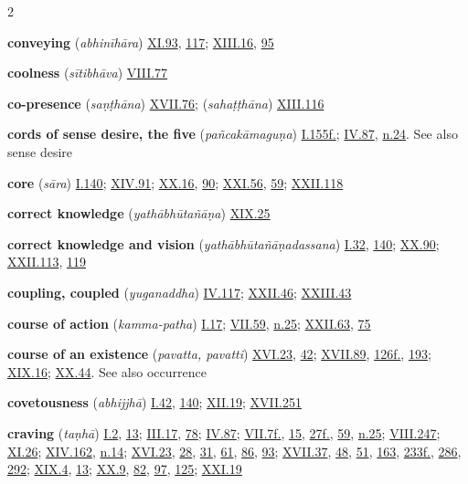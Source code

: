 \begin{multicols}{2}
\begin{vismHanging}
\par\textbf{conveying} (\emph{abhinīhāra}) \hyperlink{XI.93}{XI.93}{}, \hyperlink{XI.117}{117}{}; \hyperlink{XIII.16}{XIII.16}{}, \hyperlink{XIII.95}{95}{}
\par\textbf{coolness} (\emph{sītibhāva}) \hyperlink{VIII.77}{VIII.77}{}
\par\textbf{co-presence} (\emph{saṇṭhāna}) \hyperlink{XVII.76}{XVII.76}{}; (\emph{sahaṭṭhāna}) \hyperlink{XIII.116}{XIII.116}{}
\par\textbf{cords of sense desire, the five} (\emph{pañcakāmaguṇa}) \hyperlink{I.155}{I.155f.}{}; \hyperlink{IV.87}{IV.87}{}, \hyperlink{IV.n24}{n.24}{}. See also sense desire 
\par\textbf{core} (\emph{sāra}) \hyperlink{I.140}{I.140}{}; \hyperlink{XIV.91}{XIV.91}{}; \hyperlink{XX.16}{XX.16}{}, \hyperlink{XX.90}{90}{}; \hyperlink{XXI.56}{XXI.56}{}, \hyperlink{XXI.59}{59}{}; \hyperlink{XXII.118}{XXII.118}{}
\par\textbf{correct knowledge} (\emph{yathābhūtañāṇa}) \hyperlink{XIX.25}{XIX.25}{}
\par\textbf{correct knowledge and vision} (\emph{yathābhūtañāṇadassana}) \hyperlink{I.32}{I.32}{}, \hyperlink{I.140}{140}{}; \hyperlink{XX.90}{XX.90}{}; \hyperlink{XXII.113}{XXII.113}{}, \hyperlink{XXII.119}{119}{}
\par\textbf{coupling, coupled} (\emph{yuganaddha}) \hyperlink{IV.117}{IV.117}{}; \hyperlink{XXII.46}{XXII.46}{}; \hyperlink{XXIII.43}{XXIII.43}{}
\par\textbf{course of action} (\emph{kamma-patha}) \hyperlink{I.17}{I.17}{}; \hyperlink{VII.59}{VII.59}{}, \hyperlink{VII.n25}{n.25}{}; \hyperlink{XXII.63}{XXII.63}{}, \hyperlink{XXII.75}{75}{}
\par\textbf{course of an existence} (\emph{pavatta, pavatti}) \hyperlink{XVI.23}{XVI.23}{}, \hyperlink{XVI.42}{42}{}; \hyperlink{XVII.89}{XVII.89}{}, \hyperlink{XVII.126}{126f.}{}, \hyperlink{XVII.193}{193}{}; \hyperlink{XIX.16}{XIX.16}{}; \hyperlink{XX.44}{XX.44}{}. See also occurrence 
\par\textbf{covetousness} (\emph{abhijjhā}) \hyperlink{I.42}{I.42}{}, \hyperlink{I.140}{140}{}; \hyperlink{XII.19}{XII.19}{}; \hyperlink{XVII.251}{XVII.251}{}
\par\textbf{craving} (\emph{taṇhā}) \hyperlink{I.2}{I.2}{}, \hyperlink{I.13}{13}{}; \hyperlink{III.17}{III.17}{}, \hyperlink{III.78}{78}{}; \hyperlink{IV.87}{IV.87}{}; \hyperlink{VII.7}{VII.7f.}{}, \hyperlink{VII.15}{15}{}, \hyperlink{VII.27}{27f.}{}, \hyperlink{VII.59}{59}{}, \hyperlink{VII.n25}{n.25}{}; \hyperlink{VIII.247}{VIII.247}{}; \hyperlink{XI.26}{XI.26}{}; \hyperlink{XIV.162}{XIV.162}{}, \hyperlink{XIV.n14}{n.14}{}; \hyperlink{XVI.23}{XVI.23}{}, \hyperlink{XVI.28}{28}{}, \hyperlink{XVI.31}{31}{}, \hyperlink{XVI.61}{61}{}, \hyperlink{XVI.86}{86}{}, \hyperlink{XVI.93}{93}{}; \hyperlink{XVII.37}{XVII.37}{}, \hyperlink{XVII.48}{48}{}, \hyperlink{XVII.51}{51}{}, \hyperlink{XVII.163}{163}{}, \hyperlink{XVII.233}{233f.}{}, \hyperlink{XVII.286}{286}{}, \hyperlink{XVII.292}{292}{}; \hyperlink{XIX.4}{XIX.4}{}, \hyperlink{XIX.13}{13}{}; \hyperlink{XX.9}{XX.9}{}, \hyperlink{XX.82}{82}{}, \hyperlink{XX.97}{97}{}, \hyperlink{XX.125}{125}{}; \hyperlink{XXI.19}{XXI.19}{}

\end{vismHanging}
\end{multicols}
